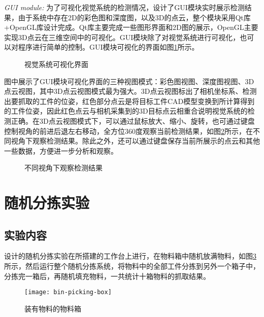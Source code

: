 \emph{GUI module:}
为了可视化视觉系统的检测情况，设计了GUI模块实时展示检测结果，由于系统中存在2D的彩色图和深度图，以及3D的点云，整个模块采用Qt库+OpenGL库设计完成。Qt库主要完成一些图形界面和2D图的展示，OpenGL主要实现3D点云在三维空间中的可视化。GUI模块除了对视觉系统进行可视化，也可以对程序进行简单的控制。GUI模块可视化的界面如图\ref{fig:gui}所示。
\begin{figure}[ht]
  \centering
  \hskip0.1cm
  \hskip0.1cm
  \caption{视觉系统可视化界面}
  \label{fig:gui}
\end{figure}
图中展示了GUI模块可视化界面的三种视图模式：彩色图视图、深度图视图、3D点云视图，其中3D点云视图模式最为强大。3D点云视图标出了相机坐标系、检测出要抓取的工件的位姿，红色部分点云是将目标工件CAD模型变换到所计算得到的工件位姿，因此红色点云与相机采集到的3D目标点云相重合说明视觉系统的检测正确。在3D点云视图模式下，可以通过鼠标放大、缩小、旋转，也可通过键盘控制视角的前进后退左右移动，全方位360度观察当前检测结果，如图\ref{fig:view-pose}所示，在不同视角下观察检测结果。除此之外，还可以通过键盘保存当前所展示的点云和其他一些数据，方便进一步分析和观察。
\begin{figure}[ht]
  \centering
  \hfill
  \caption{不同视角下观察检测结果}
  \label{fig:view-pose}
\end{figure}

\section{随机分拣实验}
\subsection{实验内容}
设计的随机分拣实验在所搭建的工作台上进行，在物料箱中随机放满物料，如图\ref{fig:bin-picking-box}所示，然后运行整个随机分拣系统，将物料中的全部工件分拣到另外一个箱子中，分拣完一箱后，再随机填充物料，一共统计十箱物料的抓取结果。
\begin{figure}[ht]
  \centering
  \texttt{[image: bin-picking-box]}
  \caption{装有物料的物料箱}
  \label{fig:bin-picking-box}
\end{figure}

